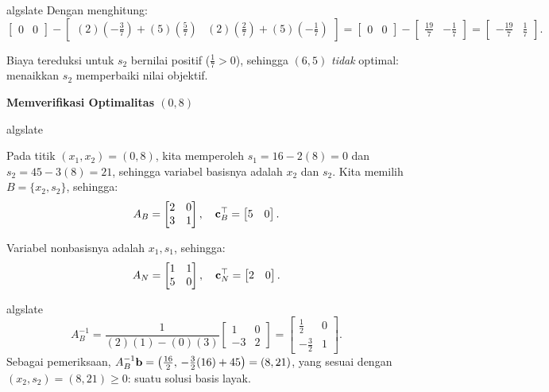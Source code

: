 \begin{solution}
\begin{steppanel}{algslate}
Dengan menghitung:
\[
\begin{bmatrix}
    0 & 0
\end{bmatrix}
-
\begin{bmatrix}
    (2)(-\tfrac37) + (5)(\tfrac57) & (2)(\tfrac27) + (5)(-\tfrac17)
\end{bmatrix}
=
\begin{bmatrix}
    0 & 0
\end{bmatrix}
-
\begin{bmatrix}
    \tfrac{19}{7} & -\tfrac17
\end{bmatrix}
=
\begin{bmatrix}
    -\tfrac{19}{7} & \tfrac17
\end{bmatrix}.
\]

Biaya tereduksi untuk $s_2$ bernilai positif ($\tfrac17 > 0$), sehingga \( (6,5) \) \emph{tidak} optimal: menaikkan $s_2$ memperbaiki nilai objektif.
\end{steppanel}

\textbf{Memverifikasi Optimalitas \( (0,8) \)}

\begin{steppanel}{algslate}

Pada titik $(x_1, x_2) = (0,8)$, kita memperoleh $s_1 = 16 - 2(8) = 0$ dan $s_2 = 45 - 3(8) = 21$, sehingga variabel basisnya adalah $x_2$ dan $s_2$.  Kita memilih \(B= \{x_2, s_2\} \), sehingga:
\[
A_B =
\begin{bmatrix}
    2 & 0 \\
    3 & 1
\end{bmatrix}, \quad
\mathbf{c}_B^\top =
\begin{bmatrix}
    5 & 0
\end{bmatrix}.
\]

Variabel nonbasisnya adalah \( x_1, s_1 \), sehingga:
\[
A_N =
\begin{bmatrix}
    1 & 1 \\
    5 & 0
\end{bmatrix}, \quad
\mathbf{c}_N^\top =
\begin{bmatrix}
    2 & 0
\end{bmatrix}.
\]

\end{steppanel}
\begin{steppanel}{algslate}
\[
A_B^{-1} =
\frac{1}{(2)(1) - (0)(3)}
\begin{bmatrix}
    1 & 0 \\
    -3 & 2
\end{bmatrix}
=
\begin{bmatrix}
    \tfrac12 & 0 \\
    -\tfrac32 & 1
\end{bmatrix}.
\]
Sebagai pemeriksaan, $A_B^{-1}\mathbf{b} = \left(\tfrac{16}{2},\, -\tfrac{3}{2}(16) + 45\right) = (8, 21)$, yang sesuai dengan $(x_2, s_2) = (8, 21) \geq 0$: suatu solusi basis layak.


\end{steppanel}
\end{solution}
